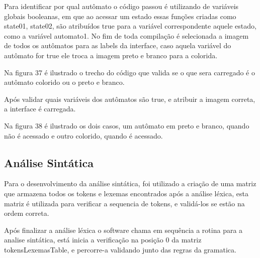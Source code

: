 \documentclass[12pt,oneside,a4paper,chapter=TITLE,section=TITLE,sumario=tradicional]{abntex2}
\begin{document}
\begin{figure}[htb]
\end{figure} 

Para identificar por qual autômato o código passou é utilizando de variáveis globais booleanas, em que ao acessar um estado essas funções criadas como state01, state02, são atribuídos true para a variável correspondente aquele estado, como a variável automato1. No fim de toda compilação é selecionada a imagem de todos os autômatos para as labels da interface, caso aquela variável do autômato for true ele troca a imagem preto e branco para a colorida.  

Na figura 37 é ilustrado o trecho do código que valida se o que sera carregado é o autômato colorido ou o preto e branco. 

\begin{figure}[htb]
\end{figure} 

Após validar quais variáveis dos autômatos são true, e atribuir a imagem correta, a interface é carregada. 

Na figura 38 é ilustrado os dois casos, um autômato em preto e branco, quando não é acessado e outro colorido, quando é acessado. 

\begin{figure}[htb]
\end{figure} 

\subsection{Análise Sintática}
\label{subsec:analisesintatica}

Para o desenvolvimento da análise sintática, foi utilizado a criação de uma matriz que armazena todos os tokens e lexemas encontrados após a análise léxica, esta matriz é utilizada para verificar a sequencia de tokens, e validá-los se estão na ordem correta.  

Após finalizar a análise léxica o software chama em sequência a rotina para a analise sintática, está inicia a verificação na posição 0 da matriz tokensLexemasTable, e percorre-a validando junto das regras da gramatica.  
\end{document}
